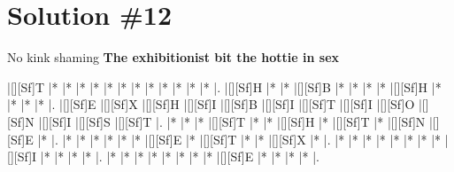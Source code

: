 \documentclass[letterpaper]{article}
\begin{document}
\newpage
\section*{Solution \#12}
No kink shaming
\newline\textbf{The exhibitionist bit the hottie in sex}

\vspace*{1em}
\begin{Puzzle}{13}{7}
|[][Sf]T  |*        |*        |*        |*        |*        |*        |*        |*        |*        |*        |*        |*        |.
|[][Sf]H  |*        |*        |[][Sf]B  |*        |*        |*        |*        |[][Sf]H  |*        |*        |*        |*        |.
|[][Sf]E  |[][Sf]X  |[][Sf]H  |[][Sf]I  |[][Sf]B  |[][Sf]I  |[][Sf]T  |[][Sf]I  |[][Sf]O  |[][Sf]N  |[][Sf]I  |[][Sf]S  |[][Sf]T  |.
|*        |*        |*        |[][Sf]T  |*        |*        |[][Sf]H  |*        |[][Sf]T  |*        |[][Sf]N  |[][Sf]E  |*        |.
|*        |*        |*        |*        |*        |*        |[][Sf]E  |*        |[][Sf]T  |*        |*        |[][Sf]X  |*        |.
|*        |*        |*        |*        |*        |*        |*        |*        |[][Sf]I  |*        |*        |*        |*        |.
|*        |*        |*        |*        |*        |*        |*        |*        |[][Sf]E  |*        |*        |*        |*        |.
\end{Puzzle}
\end{document}

